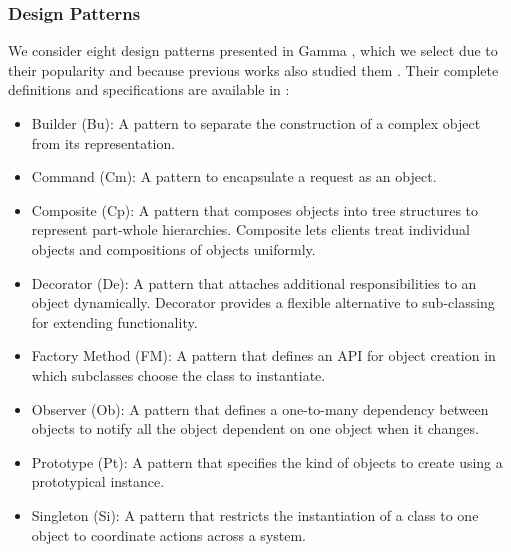 \subsubsection{Design Patterns}

We consider eight design patterns presented in Gamma \etal \cite{gamma1995design}, which we select due to their popularity and because previous works also studied them \cite{tsantalis2006design,vlissides1995design}. Their complete definitions and specifications are available in \cite{vlissides1995design,khomh2009playing}:

\begin{itemize}
\item Builder (Bu): A pattern to separate the construction of a complex object from its representation.

\item Command (Cm): A pattern to encapsulate a request as an object.

\item Composite (Cp): A pattern that composes objects into tree structures to represent part-whole hierarchies. Composite lets clients treat individual objects and compositions of objects uniformly.

\item Decorator (De): A pattern that attaches additional responsibilities to an object dynamically. Decorator provides a flexible alternative to sub-classing for extending functionality.

\item Factory Method (FM): A pattern that defines an API for object creation in which subclasses choose the class to instantiate.

\item Observer (Ob): A pattern that defines a one-to-many dependency between objects to notify all the object dependent on one object when it changes.

\item Prototype (Pt): A pattern that specifies the kind of objects to create using a prototypical instance.

\item Singleton (Si): A pattern that restricts the instantiation of a class to one object to coordinate actions across a system.
\end{itemize}